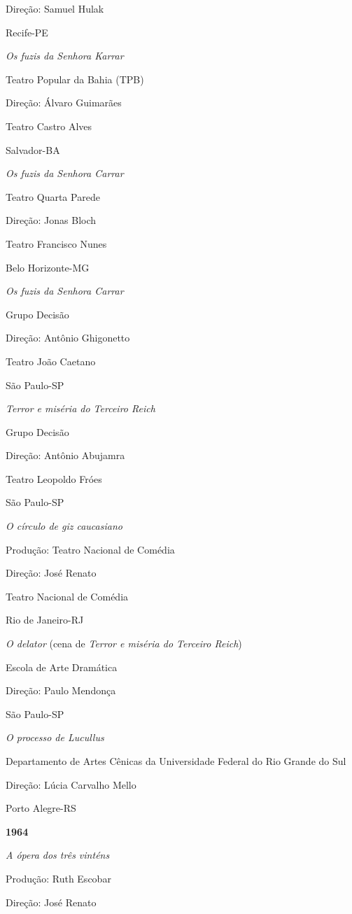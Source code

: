 Direção: Samuel Hulak

Recife-PE

\textit{Os fuzis da Senhora Karrar}

Teatro Popular da Bahia (TPB)

Direção: Álvaro Guimarães

Teatro Castro Alves

Salvador-BA

\textit{Os fuzis da Senhora Carrar}

Teatro Quarta Parede

Direção: Jonas Bloch

Teatro Francisco Nunes

Belo Horizonte-MG

\textit{Os fuzis da Senhora Carrar}

Grupo Decisão

Direção: Antônio Ghigonetto

Teatro João Caetano

São Paulo-SP

\textit{Terror e miséria do Terceiro Reich}

Grupo Decisão

Direção: Antônio Abujamra

Teatro Leopoldo Fróes

São Paulo-SP

\textit{O círculo de giz caucasiano}

Produção: Teatro Nacional de Comédia

Direção: José Renato

Teatro Nacional de Comédia

Rio de Janeiro-RJ

\textit{O delator} (cena de \textit{Terror e miséria do Terceiro Reich})

Escola de Arte Dramática

Direção: Paulo Mendonça

São Paulo-SP

\textit{O processo de Lucullus}

Departamento de Artes Cênicas da Universidade Federal do Rio Grande do
Sul

Direção: Lúcia Carvalho Mello

Porto Alegre-RS

\textbf{1964}

\textit{A ópera dos três vinténs}

Produção: Ruth Escobar

Direção: José Renato

